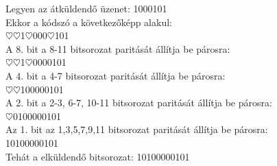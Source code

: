 \documentclass[margin=0px]{article}
\begin{document}
\begin{description}
\begin{itemize}
                  Legyen az átküldendő üzenet: 1000101 \\
                  Ekkor a kódszó a következőképp alakul: \\
                  {\color[rgb]{1,0,0}$\heartsuit\heartsuit$}1{\color[rgb]{1,0,0}$\heartsuit$}000{\color[rgb]{1,0,0}$\heartsuit$}101\\
                  A 8. bit a 8-11  bitsorozat paritását állítja be párosra:\\
                  {\color[rgb]{1,0,0}$\heartsuit\heartsuit$}1{\color[rgb]{1,0,0}$\heartsuit$}000{\color[rgb]{0,0,1}0101}\\
                  A 4. bit a 4-7  bitsorozat paritását állítja be párosra:\\
                  {\color[rgb]{1,0,0}$\heartsuit\heartsuit$}1{\color[rgb]{0,0,1}0000}0101\\
                  A 2. bit a 2-3, 6-7, 10-11 bitsorozat paritását állítja be párosra:\\
                  {\color[rgb]{1,0,0}$\heartsuit$}{\color[rgb]{0,0,1}01}00{\color[rgb]{0,0,1}00}01{\color[rgb]{0,0,1}01}\\
                  Az 1. bit az 1,3,5,7,9,11 bitsorozat paritását állítja be párosra: \\
                  {\color[rgb]{0,0,1}1}0{\color[rgb]{0,0,1}1}0{\color[rgb]{0,0,1}0}0{\color[rgb]{0,0,1}0}0{\color[rgb]{0,0,1}1}0{\color[rgb]{0,0,1}1}\\

                  Tehát a elküldendő bitsorozat:
                  {\color[rgb]{1,0,0}10}1{\color[rgb]{1,0,0}0}000{\color[rgb]{1,0,0}0}101\\


\end{itemize}
\end{description}
\end{document}
